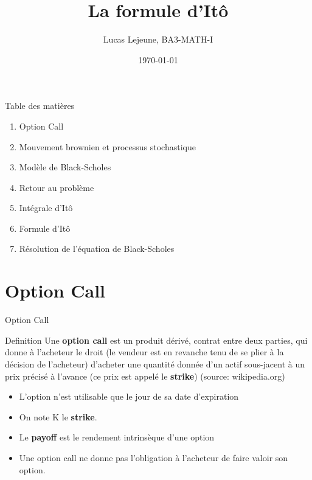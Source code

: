 \documentclass{beamer}
\title{La formule d'Itô}
\date{\today}
\author{Lucas Lejeune, BA3-MATH-I}
\newcommand{\1}{\mathmybb{1}}
\begin{document}
\frame{\titlepage}

\begin{frame}{Table des matières}
  \begin{enumerate}
    \item Option Call
    \item Mouvement brownien et processus stochastique
    \item Modèle de Black-Scholes
    \item Retour au problème
    \item Intégrale d'Itô
    \item Formule d'Itô
    \item Résolution de l'équation de Black-Scholes
  \end{enumerate}
\end{frame}
\section{Option Call}
\begin{frame}{Option Call}
  \begin{block}{Definition}
    Une \textbf{option call} est un produit dérivé, contrat entre deux parties, qui donne à l'acheteur le droit (le vendeur est en revanche tenu de se plier à la décision de l'acheteur) d'acheter une quantité donnée d'un actif sous-jacent à un prix précisé à l'avance (ce prix est appelé le \textbf{strike}) (source: wikipedia.org)
  \end{block}
  \pause
  \begin{itemize}
  \item L'option n'est utilisable que le jour de sa date d'expiration
  \item On note K le \textbf{strike}.
  \item Le \textbf{payoff} est le rendement intrinsèque d'une option
    \item Une option call ne donne pas l'obligation à l'acheteur de faire valoir son option.
  \end{itemize}
\end{frame}
\end{document}
